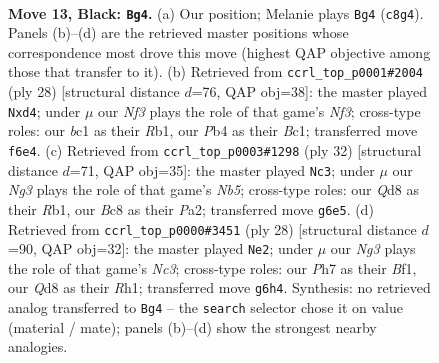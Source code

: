 \documentclass[11pt]{article}
\begin{document}
\clearpage

\begin{figure}[p]\centering
\begin{subfigure}{0.46\textwidth}\centering
\resizebox{\linewidth}{!}{%
\newchessgame
\chessboard[
  setfen={r1bq1rk1/2p1bppp/p2p1nn1/7P/1pPNPP2/1B6/PP4P1/RNBQR1K1 b - - 0 13},
  showmover=false,
  pgfstyle=straightmove, color=movearrow, markmove={c8-g4}
]}
\caption{}
\end{subfigure}\hfill
\begin{subfigure}{0.46\textwidth}\centering
\resizebox{\linewidth}{!}{%
\newchessgame
\chessboard[
  setfen={r1bq1r1k/ppn3bp/2pp1ppn/8/1PPpP3/2N2N1P/P1Q1BPP1/1RB2RK1 w - - 0 15},
  showmover=false,
  pgfstyle=straightmove, color=movearrow, markmove={f3-d4}
]}
\caption{}
\end{subfigure}
\\[4pt]
\begin{subfigure}{0.46\textwidth}\centering
\resizebox{\linewidth}{!}{%
\newchessgame
\chessboard[
  setfen={r1bq1r1k/pp4bp/2pp1ppn/1N4n1/1PPNP3/4B3/P3BPPP/1RQ2RK1 w - - 0 17},
  showmover=false,
  pgfstyle=straightmove, color=movearrow, markmove={b5-c3}
]}
\caption{}
\end{subfigure}\hfill
\begin{subfigure}{0.46\textwidth}\centering
\resizebox{\linewidth}{!}{%
\newchessgame
\chessboard[
  setfen={1rb1kb1r/2q2ppp/pnnpp3/6P1/1p2P2P/1NN1BP2/PPP2Q2/2KR1B1R w k - 0 15},
  showmover=false,
  pgfstyle=straightmove, color=movearrow, markmove={c3-e2}
]}
\caption{}
\end{subfigure}
\caption{\textbf{Move 13, Black: \texttt{Bg4}.} (a) Our position; Melanie plays \texttt{Bg4} (\texttt{c8g4}). Panels (b)--(d) are the retrieved master positions whose correspondence most drove this move (highest QAP objective among those that transfer to it). (b) Retrieved from \texttt{ccrl\_top\_p0001\#2004} (ply 28) [structural distance $d$=76, QAP obj=38]: the master played \texttt{Nxd4}; under $\mu$ our \emph{Nf3} plays the role of that game's \emph{Nf3}; cross-type roles: our \emph{b}c1 as their \emph{R}b1, our \emph{P}b4 as their \emph{B}c1; transferred move \texttt{f6e4}. (c) Retrieved from \texttt{ccrl\_top\_p0003\#1298} (ply 32) [structural distance $d$=71, QAP obj=35]: the master played \texttt{Nc3}; under $\mu$ our \emph{Ng3} plays the role of that game's \emph{Nb5}; cross-type roles: our \emph{Q}d8 as their \emph{R}b1, our \emph{B}c8 as their \emph{P}a2; transferred move \texttt{g6e5}. (d) Retrieved from \texttt{ccrl\_top\_p0000\#3451} (ply 28) [structural distance $d$=90, QAP obj=32]: the master played \texttt{Ne2}; under $\mu$ our \emph{Ng3} plays the role of that game's \emph{Nc3}; cross-type roles: our \emph{P}h7 as their \emph{B}f1, our \emph{Q}d8 as their \emph{R}h1; transferred move \texttt{g6h4}. Synthesis: no retrieved analog transferred to \texttt{Bg4} -- the \texttt{search} selector chose it on value (material / mate); panels (b)--(d) show the strongest nearby analogies.}
\label{fig:thought-m25}
\end{figure}
\end{document}
